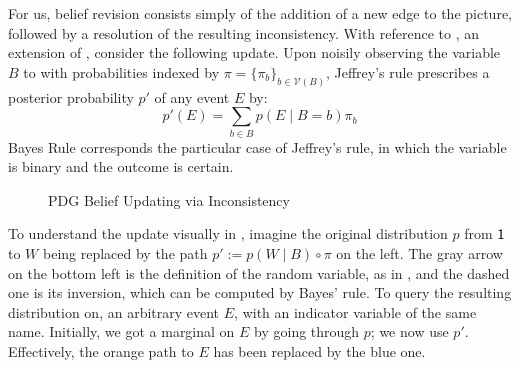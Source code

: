 \documentclass{article}
\theoremstyle{plain}
\theoremstyle{definition}
\theoremstyle{remark}
\def\sheq{\!=\!}
\newcommand{\V}{\mathcal V}
\numberwithin{equation}{section}
\begin{document}
	For us, belief revision consists simply of the addition of a new edge to the picture, followed by a resolution of the resulting inconsistency. 
	With reference to , an extension of , consider the following update. 
	Upon noisily observing the variable $B$ to with probabilities indexed by $\pi = \{\pi_b\}_{b \in \V(B)}$, Jeffrey's rule prescribes a posterior probability $p'$ of any event $E$ by:
	\[ p'(E) = \sum_{b \in B} p(E \mid B\sheq b) \pi_b \]
	Bayes Rule corresponds the particular case of Jeffrey's rule, in which the variable is binary and the outcome is certain.

	
	\begin{figure}[htb]
		\centering
%				
%				
		\caption{PDG Belief Updating via Inconsistency}
		\label{fig:belief-update}
	\end{figure}
	
	To understand the update visually in , imagine the original distribution $p$ from $\sf 1$ to $W$ being replaced by the path $p' := p(W \mid B) \circ \pi$  on the left. The gray arrow on the bottom left is the definition of the random variable, as in , and the dashed one is its inversion, which can be computed by Bayes' rule.  %
	To query the resulting distribution on, an arbitrary event $E$, with an indicator variable of the same name. Initially, we got a marginal on $E$ by going through $p$; we now use $p'$. Effectively, the orange path to $E$ has been replaced by the blue one.
\end{document}

